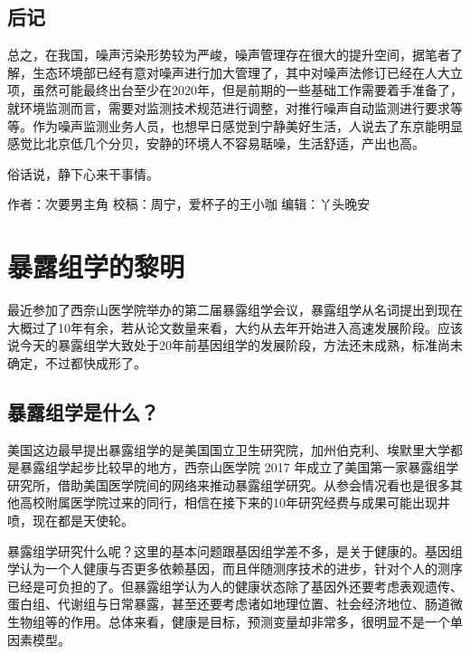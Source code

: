\documentclass[]{book}
\begin{document}
\hypertarget{ux540eux8bb0-2}{%
\subsection{后记}\label{ux540eux8bb0-2}}

总之，在我国，噪声污染形势较为严峻，噪声管理存在很大的提升空间，据笔者了解，生态环境部已经有意对噪声进行加大管理了，其中对噪声法修订已经在人大立项，虽然可能最终出台至少在2020年，但是前期的一些基础工作需要着手准备了，就环境监测而言，需要对监测技术规范进行调整，对推行噪声自动监测进行要求等等。作为噪声监测业务人员，也想早日感觉到宁静美好生活，人说去了东京能明显感觉比北京低几个分贝，安静的环境人不容易聒噪，生活舒适，产出也高。

俗话说，静下心来干事情。

作者：次要男主角
校稿：周宁，爱杯子的王小咖
编辑：丫头晚安

\hypertarget{ux66b4ux9732ux7ec4ux5b66ux7684ux9eceux660e}{%
\section{暴露组学的黎明}\label{ux66b4ux9732ux7ec4ux5b66ux7684ux9eceux660e}}

最近参加了西奈山医学院举办的第二届暴露组学会议，暴露组学从名词提出到现在大概过了10年有余，若从论文数量来看，大约从去年开始进入高速发展阶段。应该说今天的暴露组学大致处于20年前基因组学的发展阶段，方法还未成熟，标准尚未确定，不过都快成形了。

\hypertarget{ux66b4ux9732ux7ec4ux5b66ux662fux4ec0ux4e48}{%
\subsection{暴露组学是什么？}\label{ux66b4ux9732ux7ec4ux5b66ux662fux4ec0ux4e48}}

美国这边最早提出暴露组学的是美国国立卫生研究院，加州伯克利、埃默里大学都是暴露组学起步比较早的地方，西奈山医学院 2017 年成立了美国第一家暴露组学研究所，借助美国医学院间的网络来推动暴露组学研究。从参会情况看也是很多其他高校附属医学院过来的同行，相信在接下来的10年研究经费与成果可能出现井喷，现在都是天使轮。

暴露组学研究什么呢？这里的基本问题跟基因组学差不多，是关于健康的。基因组学认为一个人健康与否更多依赖基因，而且伴随测序技术的进步，针对个人的测序已经是可负担的了。但暴露组学认为人的健康状态除了基因外还要考虑表观遗传、蛋白组、代谢组与日常暴露，甚至还要考虑诸如地理位置、社会经济地位、肠道微生物组等的作用。总体来看，健康是目标，预测变量却非常多，很明显不是一个单因素模型。
\end{document}
